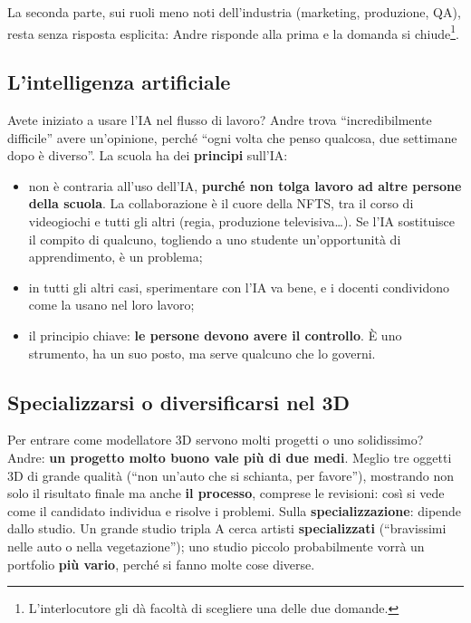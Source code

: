 La seconda parte, sui ruoli meno noti dell'industria (marketing, produzione, QA),
resta senza risposta esplicita: Andre risponde alla prima e la domanda si
chiude\footnote{L'interlocutore gli dà facoltà di scegliere una delle due
domande.}.

\subsection{L'intelligenza artificiale}

Avete iniziato a usare l'IA nel flusso di lavoro? Andre trova ``incredibilmente
difficile'' avere un'opinione, perché ``ogni volta che penso qualcosa, due settimane
dopo è diverso''. La scuola ha dei \textbf{principi} sull'IA:
\begin{itemize}
  \item non è contraria all'uso dell'IA, \textbf{purché non tolga lavoro ad altre
        persone della scuola}. La collaborazione è il cuore della NFTS, tra il
        corso di videogiochi e tutti gli altri (regia, produzione televisiva\dots).
        Se l'IA sostituisce il compito di qualcuno, togliendo a uno studente
        un'opportunità di apprendimento, è un problema;
  \item in tutti gli altri casi, sperimentare con l'IA va bene, e i docenti
        condividono come la usano nel loro lavoro;
  \item il principio chiave: \textbf{le persone devono avere il controllo}. È uno
        strumento, ha un suo posto, ma serve qualcuno che lo governi.
\end{itemize}

\subsection{Specializzarsi o diversificarsi nel 3D}

Per entrare come modellatore 3D servono molti progetti o uno solidissimo? Andre:
\textbf{un progetto molto buono vale più di due medi}. Meglio tre oggetti 3D di
grande qualità (``non un'auto che si schianta, per favore''), mostrando non solo il
risultato finale ma anche \textbf{il processo}, comprese le revisioni: così si vede
come il candidato individua e risolve i problemi. Sulla \textbf{specializzazione}:
dipende dallo studio. Un grande studio tripla A cerca artisti
\textbf{specializzati} (``bravissimi nelle auto o nella vegetazione''); uno studio
piccolo probabilmente vorrà un portfolio \textbf{più vario}, perché si fanno molte
cose diverse.

